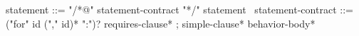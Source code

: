 \begin{syntax}
  statement ::= "/*@" statement-contract "*/" statement
  \
  statement-contract ::= {("for" id ("," id)* ":")?} requires-clause* ;
    simple-clause* behavior-body*
\end{syntax}
